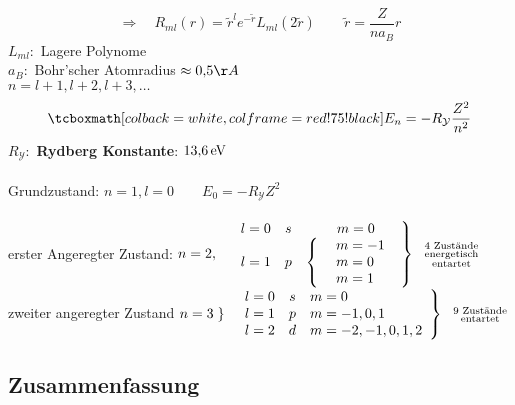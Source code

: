 \begin{enumerate}[(1)]
	\begin{equation*}
	\Rightarrow \quad R_{ml}(r) = \tilde{r}^l e^{-\tilde{r}} L_{ml}(2 \tilde{r}) \qquad \tilde{r} = \frac{Z}{n a_B} r
	\end{equation*}
	$ L_{ml} : $ Lagere Polynome\\
	$ a_B : $ Bohr'scher Atomradius $ \approx 0{,}5 \AA $\\[5pt]
	$ n = l+1, l+2, l+3, \dots $
	\begin{equation*}
	\rmbox{E_n = - R_{\mathcal{Y}} \frac{Z^2}{n^2}}
	\end{equation*}
	$ R_{\mathcal{Y}} : $ \textbf{Rydberg Konstante}: $ 13{,}6 \, \textrm{eV} $\\
	\\[5pt]
	Grundzustand: $ n=1, l=0 \qquad E_0 = - R_{\mathcal{Y}} Z^2 $\\
	\\[5pt]
	erster Angeregter Zustand:
	$ n = 2, \quad \left. \begin{array}{ccc}
	l=0 & s & \ \ \: m=0 \\
	l=1 & p & \left\{ \begin{array}{c}
	\phantom{-}m=-1\\
	m=0\\
	m=1
	\end{array} \right.
	\end{array} \right\} \ \ \substack{\textrm{4 Zustände} \\ \textrm{energetisch} \\ \textrm{entartet}} $\\[5pt]
	zweiter angeregter Zustand
	$ n = 3 \left. \right\} \ \ \left. \begin{array}{ccl}
	l=0 & s & m=0 \\
	l=1 & p & m=-1,0,1 \\
	l=2 & d & m=-2,-1,0,1,2
	\end{array} \right\} \ \ \substack{\textrm{9 Zustände} \\ \textrm{entartet}} $
\end{enumerate}


\subsection{Zusammenfassung}

